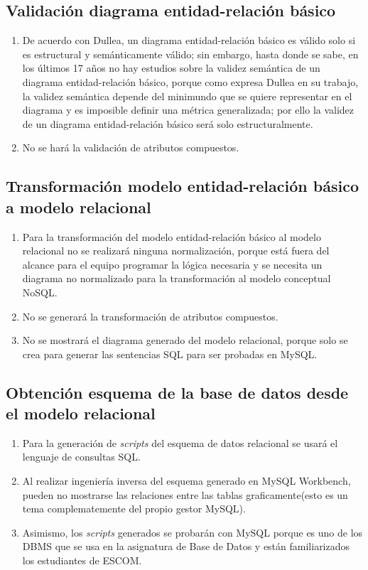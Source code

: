 \subsection*{Validación diagrama entidad-relación básico}
\begin{enumerate}
    \item De acuerdo con Dullea\cite{dullea_analysis_2003}, un diagrama entidad-relación básico es válido solo si es estructural y semánticamente válido; sin embargo, hasta donde se sabe, en los últimos 17 años no hay estudios sobre la validez semántica de un diagrama entidad-relación básico, porque como expresa Dullea en su trabajo, la validez semántica depende del minimundo que se quiere representar en el diagrama y es imposible definir una métrica generalizada; por ello la validez de un diagrama entidad-relación básico será solo estructuralmente.
    \item No se hará la validación de atributos compuestos.

\end{enumerate}

\subsection*{Transformación modelo entidad-relación básico a modelo relacional}
\begin{enumerate}
    \item Para la transformación del modelo entidad-relación básico al modelo relacional no se realizará ninguna normalización, porque está fuera del alcance para el equipo programar la lógica necesaria y se necesita un diagrama no normalizado para la transformación al modelo conceptual NoSQL.
    \item No se generará la transformación de atributos compuestos.
    \item No se mostrará el diagrama generado del modelo relacional, porque solo se crea para generar las sentencias SQL para ser probadas en MySQL.
\end{enumerate}

\subsection*{Obtención esquema de la base de datos desde el modelo relacional}
\begin{enumerate}
    \item Para la generación de \textit{scripts} del esquema de datos relacional se usará el lenguaje de consultas SQL.
    \item Al realizar ingeniería inversa del esquema generado en MySQL Workbench, pueden no mostrarse las relaciones entre las tablas graficamente(esto es un tema complematemente del propio gestor MySQL). 
    \item Asimismo, los \textit{scripts} generados se probarán con MySQL porque es uno de los DBMS que se usa en la asignatura de Base de Datos y están familiarizados los estudiantes de ESCOM.
\end{enumerate}

